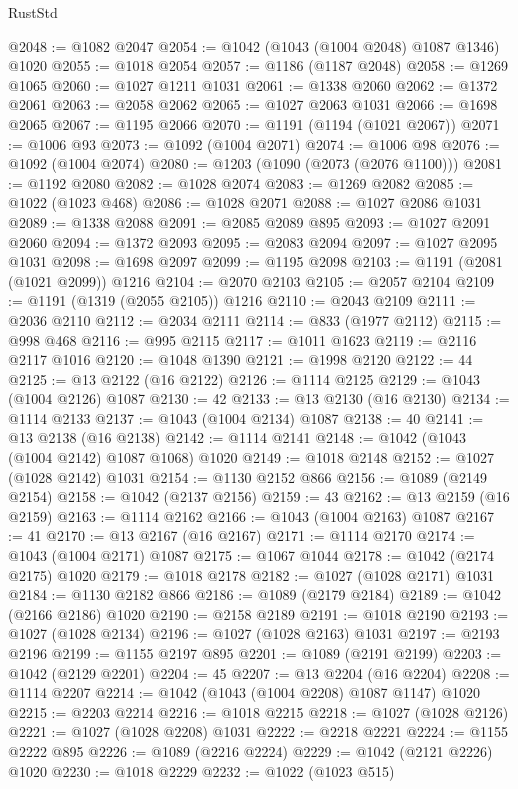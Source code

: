 \begin{lexlean}{RustStd}
\begin{coremodule}
@2048 := @1082 @2047
@2054 := @1042 (@1043 (@1004 @2048) @1087 @1346) @1020
@2055 := @1018 @2054
@2057 := @1186 (@1187 @2048)
@2058 := @1269 @1065
@2060 := @1027 @1211 @1031
@2061 := @1338 @2060
@2062 := @1372 @2061
@2063 := @2058 @2062
@2065 := @1027 @2063 @1031
@2066 := @1698 @2065
@2067 := @1195 @2066
@2070 := @1191 (@1194 (@1021 @2067))
@2071 := @1006 @93
@2073 := @1092 (@1004 @2071)
@2074 := @1006 @98
@2076 := @1092 (@1004 @2074)
@2080 := @1203 (@1090 (@2073 (@2076 @1100)))
@2081 := @1192 @2080
@2082 := @1028 @2074
@2083 := @1269 @2082
@2085 := @1022 (@1023 @468)
@2086 := @1028 @2071
@2088 := @1027 @2086 @1031
@2089 := @1338 @2088
@2091 := @2085 @2089 @895
@2093 := @1027 @2091 @2060
@2094 := @1372 @2093
@2095 := @2083 @2094
@2097 := @1027 @2095 @1031
@2098 := @1698 @2097
@2099 := @1195 @2098
@2103 := @1191 (@2081 (@1021 @2099)) @1216
@2104 := @2070 @2103
@2105 := @2057 @2104
@2109 := @1191 (@1319 (@2055 @2105)) @1216
@2110 := @2043 @2109
@2111 := @2036 @2110
@2112 := @2034 @2111
@2114 := @833 (@1977 @2112)
@2115 := @998 @468
@2116 := @995 @2115
@2117 := @1011 @1623
@2119 := @2116 @2117 @1016
@2120 := @1048 @1390
@2121 := @1998 @2120
@2122 := 44
@2125 := @13 @2122 (@16 @2122)
@2126 := @1114 @2125
@2129 := @1043 (@1004 @2126) @1087
@2130 := 42
@2133 := @13 @2130 (@16 @2130)
@2134 := @1114 @2133
@2137 := @1043 (@1004 @2134) @1087
@2138 := 40
@2141 := @13 @2138 (@16 @2138)
@2142 := @1114 @2141
@2148 := @1042 (@1043 (@1004 @2142) @1087 @1068) @1020
@2149 := @1018 @2148
@2152 := @1027 (@1028 @2142) @1031
@2154 := @1130 @2152 @866
@2156 := @1089 (@2149 @2154)
@2158 := @1042 (@2137 @2156)
@2159 := 43
@2162 := @13 @2159 (@16 @2159)
@2163 := @1114 @2162
@2166 := @1043 (@1004 @2163) @1087
@2167 := 41
@2170 := @13 @2167 (@16 @2167)
@2171 := @1114 @2170
@2174 := @1043 (@1004 @2171) @1087
@2175 := @1067 @1044
@2178 := @1042 (@2174 @2175) @1020
@2179 := @1018 @2178
@2182 := @1027 (@1028 @2171) @1031
@2184 := @1130 @2182 @866
@2186 := @1089 (@2179 @2184)
@2189 := @1042 (@2166 @2186) @1020
@2190 := @2158 @2189
@2191 := @1018 @2190
@2193 := @1027 (@1028 @2134)
@2196 := @1027 (@1028 @2163) @1031
@2197 := @2193 @2196
@2199 := @1155 @2197 @895
@2201 := @1089 (@2191 @2199)
@2203 := @1042 (@2129 @2201)
@2204 := 45
@2207 := @13 @2204 (@16 @2204)
@2208 := @1114 @2207
@2214 := @1042 (@1043 (@1004 @2208) @1087 @1147) @1020
@2215 := @2203 @2214
@2216 := @1018 @2215
@2218 := @1027 (@1028 @2126)
@2221 := @1027 (@1028 @2208) @1031
@2222 := @2218 @2221
@2224 := @1155 @2222 @895
@2226 := @1089 (@2216 @2224)
@2229 := @1042 (@2121 @2226) @1020
@2230 := @1018 @2229
@2232 := @1022 (@1023 @515)

\end{coremodule}
\end{lexlean}
